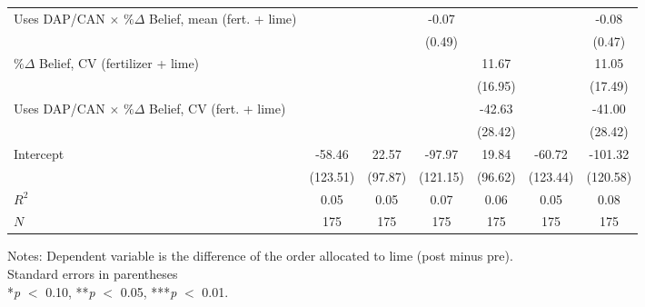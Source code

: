 \begin{table}[htbp]
\begin{threeparttable}
\begin{tabular}{l cccccc}
Uses DAP/CAN $\times$ $\% \Delta$ Belief, mean (fert. + lime)&               &               &       -0.07   &               &               &       -0.08   \\
                    &               &               &      (0.49)   &               &               &      (0.47)   \\
$\% \Delta$ Belief, CV (fertilizer + lime)&               &               &               &       11.67   &               &       11.05   \\
                    &               &               &               &     (16.95)   &               &     (17.49)   \\
Uses DAP/CAN $\times$ $\% \Delta$ Belief, CV (fert. + lime)&               &               &               &      -42.63   &               &      -41.00   \\
                    &               &               &               &     (28.42)   &               &     (28.42)   \\
Intercept           &      -58.46   &       22.57   &      -97.97   &       19.84   &      -60.72   &     -101.32   \\
                    &    (123.51)   &     (97.87)   &    (121.15)   &     (96.62)   &    (123.44)   &    (120.58)   \\
\hline
$R^2$               &        0.05   &        0.05   &        0.07   &        0.06   &        0.05   &        0.08   \\
$N$                 &         175   &         175   &         175   &         175   &         175   &         175   \\
\hline
\hline
\end{tabular}
\begin{tablenotes}
\footnotesize
\item{Notes:  Dependent variable is the difference of the order allocated to lime (post minus pre). \\ Standard errors in parentheses \\ *\textit{p} $<$ 0.10, **\textit{p} $<$ 0.05, ***\textit{p} $<$ 0.01.}
\end{tablenotes}
\end{threeparttable}
\end{table}
